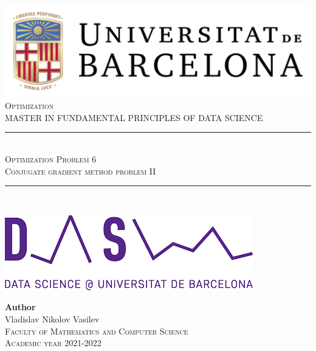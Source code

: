 \documentclass[11pt,a4paper]{article}
\newcommand{\subject}{Optimization}
\newcommand{\autor}{Vladislav Nikolov Vasilev}
\newcommand{\titulo}{Optimization Problem 6}
\newcommand{\subtitulo}{Conjugate gradient method problem II}
\newcommand{\masters}{Master in Fundamental Principles of Data Science}
\begin{document}

\begin{titlepage}
  \begin{minipage}{\textwidth}
    \centering
    \includegraphics[scale=0.25]{img/ub-logo}\\[2cm]
    
    \textsc{\Large \subject\\[0.5cm]}
    \textsc{\uppercase\expandafter{\masters}}\\[1.5cm]
    
    \noindent\rule[-1ex]{\textwidth}{1pt}\\[1.5ex]
    \textsc{{\Huge \titulo\\[0.5ex]}}
    \textsc{{\Large \subtitulo\\}}
    \noindent\rule[-1ex]{\textwidth}{2pt}\\[3.5ex]
  \end{minipage}
  
  \vspace{2cm}
  
  \begin{minipage}{\textwidth}
    \centering
    
    \includegraphics[scale=0.4]{img/ub-ds-logo}
    \vspace{2cm}
    
    \textbf{Author}\\ {\autor{}}\\[2.5ex]
    \textsc{Faculty of Mathematics and Computer Science}\\
    \vspace{1em}
    \textsc{Academic year 2021-2022}
  \end{minipage}
\end{titlepage}
\end{document}
